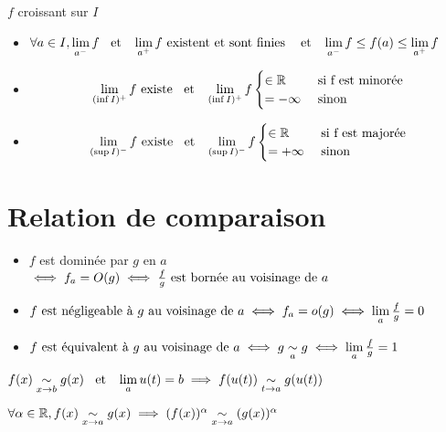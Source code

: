 \begin{thm}
$f$ croissant sur $I$
\begin{itemize}
    \item $\forall a \in I, \lm_{a^-} f \et \lm_{a^+} f 
    \text{ existent et sont finies }
    \et \lm_{a^-} f \leq f(a) \leq \lm_{a^+} f$
    \item \[
        \lm_{(\inf I)^+} f \text{ existe} \et
        \lm_{(\inf I)^+} f 
        \begin{cases}
            \in \R      &\text{ si f est minorée} \\
            = -\infty   &\text{ sinon}
        \end{cases}
    \]
    \item \[
        \lm_{(\sup I)^-} f \text{ existe} \et
        \lm_{(\sup I)^-} f 
        \begin{cases}
            \in \R      &\text{ si f est majorée} \\
            = +\infty   &\text{ sinon}
        \end{cases}
    \]
\end{itemize}
\end{thm}

\section{Relation de comparaison}

\begin{dfn}
\begin{itemize}
    \item $f$ est dominée par $g$ en $a$ $\iff f_a = O(g) \iff
    \frac{f}{g} \text{ est bornée} \voi{a}$
    \item $f \text{ est négligeable à } g \voi{a} \iff f_a = o(g)
    \iff \lm_a \frac{f}{g} = 0$
    \item $f \text{ est équivalent à } g \voi{a} \iff g \equ[a] g
    \iff \lm_a \frac{f}{g} = 1$
\end{itemize}
\end{dfn}

\begin{prp}
$f(x) \equ[x \to b] g(x) \et \lm_a u(t) = b 
\implies f(u(t)) \equ[t \to a] g(u(t))$
\end{prp}

\begin{prp}
$\forall \alpha \in \R, f(x) \equ[x \to a] g(x)
\implies (f(x))^\alpha \equ[x \to a] (g(x))^\alpha$
\end{prp}

